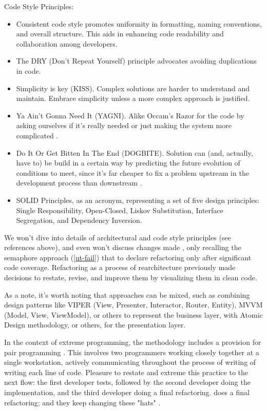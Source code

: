 \noindent Code Style Principles:

\begin{itemize}
  \item Consistent code style \cite{Mart22} promotes uniformity in formatting, naming conventions, and overall structure. 
  This aids in enhancing code readability and collaboration among developers.

  \item The DRY (Don't Repeat Yourself) principle advocates avoiding duplications in code.

  \item Simplicity is key (KISS). Complex solutions are harder to understand and maintain. Embrace simplicity unless a 
  more complex approach is justified.

  \item Ya Ain't Gonna Need It (YAGNI). Alike Occam's Razor for the code by asking ourselves if it's really needed or 
  just making the system more complicated \cite{LaiJ23}.

  \item Do It Or Get Bitten In The End (DOGBITE). Solution can (and, actually, have to) be build in a certain way 
  by predicting the future evolution of conditions to meet, since it's far cheaper to fix a problem upstream in the 
  development process than downstream \cite{McCo97}.

  \item SOLID Principles, as an acronym, representing a set of five design principles: Single Responsibility, 
  Open-Closed, Liskov Substitution, Interface Segregation, and Dependency Inversion.
\end{itemize}

\noindent We won't dive into details of architectural and code style principles (see references above), and even won't 
discuss changes made  , only recalling the semaphore approach (\ref{ut-fail}) that to declare 
refactoring only after significant code coverage. Refactoring as a process of rearchitecture \cite{Chec23} previously 
made decisions to restate, revise, and improve them by visualizing them in clean code. 

As a note, it's worth noting that approaches can be mixed, such as combining design patterns like VIPER (View, Presenter, 
Interactor, Router, Entity), MVVM (Model, View, ViewModel), or others to represent the business layer, with Atomic Design 
\cite{Kama22} methodology, or others, for the presentation layer.

In the context of extreme programming, the methodology includes a provision for pair programming \cite{Ligu19}. This 
involves two programmers working closely together at a single workstation, actively communicating throughout the process 
of writing of writing each line of code. Pleasure to restate and extreme this practice to the next flow: the first 
developer tests, followed by the second developer doing the implementation, and the third developer doing a final 
refactoring. does a final refactoring; and they keep changing these "hats" \cite{Bono17}.
